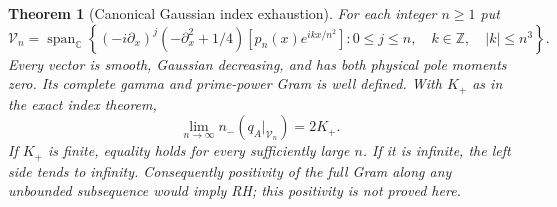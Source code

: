 \documentclass[11pt]{article}
\newtheorem{theorem}{Theorem}
\theoremstyle{remark}\newtheorem{remark}[theorem]{Remark}
\newcommand{\C}{\mathbb C}
\newcommand{\Z}{\mathbb Z}
\begin{document}
\begin{theorem}[Canonical Gaussian index exhaustion]
\label{thm:canonical-gaussian-index}
For each integer $n\ge1$ put
\[
 \mathcal V_n=\operatorname{span}_{\C}
 \left\{(-i\partial_x)^j(-\partial_x^2+1/4)
       [p_n(x)e^{ikx/n^2}]:
          0\le j\le n,\quad k\in\Z,\quad |k|\le n^3\right\}.
                                                        \tag{CDX1}
\]
Every vector is smooth, Gaussian decreasing, and has both
physical pole moments zero. Its complete gamma and prime-power
Gram is well defined. With $K_+$ as in the exact index theorem,
\[
 \lim_{n\to\infty}n_-(q_A|_{\mathcal V_n})=2K_+.            \tag{CDX2}
\]
If $K_+$ is finite, equality holds for every sufficiently
large $n$. If it is infinite, the left side tends to infinity.
Consequently positivity of the full Gram along any unbounded
subsequence would imply RH; this positivity is not proved here.
\end{theorem}
\end{document}
